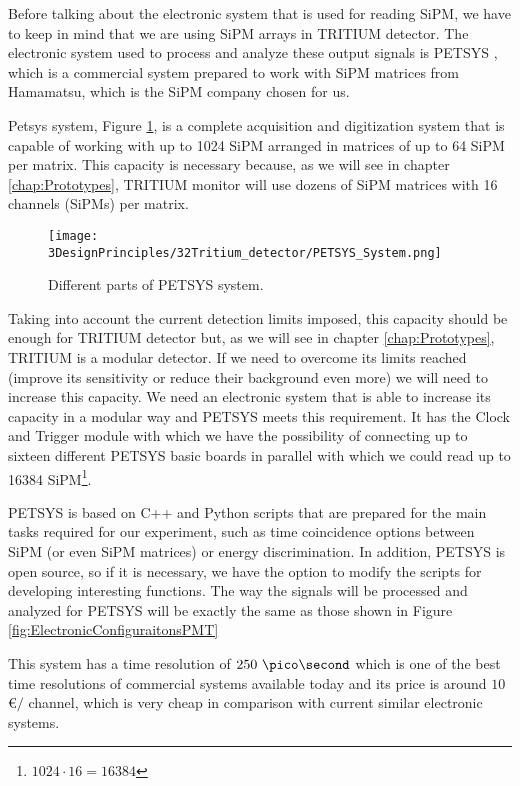 Before talking about the electronic system that is used for reading SiPM, we have to keep in mind that we are using SiPM arrays in TRITIUM detector. The electronic system used to process and analyze these output signals is PETSYS \cite{PETSYS}, which is a commercial system prepared to work with SiPM matrices from Hamamatsu, which is the SiPM company chosen for us.

Petsys system, Figure \ref{fig:PETSYS}, is a complete acquisition and digitization system that is capable of working with up to 1024 SiPM arranged in matrices of up to 64 SiPM per matrix. This capacity is necessary because, as we will see in chapter \ref{chap:Prototypes}, TRITIUM monitor will use dozens of SiPM matrices with 16 channels (SiPMs) per matrix.

\begin{figure}[htbp]
\centering
\texttt{[image: 3DesignPrinciples/32Tritium\_detector/PETSYS\_System.png]}
\caption{Different parts of PETSYS system.\label{fig:PETSYS}~\cite{PETSYS}}
\end{figure}

Taking into account the current detection limits imposed, this capacity should be enough for TRITIUM detector but, as we will see in chapter \ref{chap:Prototypes}, TRITIUM is a modular detector. If we need to overcome its limits reached (improve its sensitivity or reduce their background even more) we will need to increase this capacity. We need an electronic system that is able to increase its capacity in a modular way and PETSYS meets this requirement. It has the Clock and Trigger module with which we have the possibility of connecting up to sixteen different PETSYS basic boards in parallel with which we could read up to 16384 SiPM\footnote{$1024\cdot{}16 = 16384$}.

PETSYS is based on C++ and Python scripts that are prepared for the main tasks required for our experiment, such as time coincidence options between SiPM (or even SiPM matrices) or energy discrimination. In addition, PETSYS is open source, so if it is necessary, we have the option to modify the scripts for developing interesting functions. The way the signals will be processed and analyzed for PETSYS will be exactly the same as those shown in Figure \ref{fig:ElectronicConfiguraitonsPMT}

This system has a time resolution of $250~\pico\second$ which is one of the best time resolutions of commercial systems available today and its price is around $10$\euro$/$ channel, which is very cheap in comparison with current similar electronic systems.

